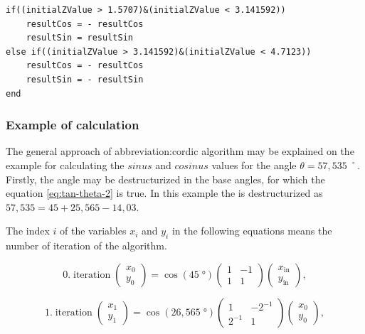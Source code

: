 \documentclass[a4paper, twoside, 11pt]{article}
\begin{document}
\begin{lstlisting}[language={pseudocode}, caption={Pseudocode for if statements used at the final $sinus$ and $cosinus$ value calculation.}, label= {lst:cordic-ending-if-statements}]
if((initialZValue > 1.5707)&(initialZValue < 3.141592))
    resultCos = - resultCos
    resultSin = resultSin
else if((initialZValue > 3.141592)&(initialZValue < 4.7123))
    resultCos = - resultCos
    resultSin = - resultSin
end
\end{lstlisting}

        \subsubsection{Example of calculation}\label{subsubsec:example-of-calculation}
            The general approach of \gls{abbreviation:cordic} algorithm may be explained on the example for calculating the $sinus$ and $cosinus$ values for the angle $\theta = 57,535\;˚$. Firstly, the angle may be destructurized in the base angles, for which the equation \ref{eq:tan-theta-2} is true. In this example the is destructurized as $57,535 = 45 + 25,565 -14,03$.\par
            The index $i$ of the variables $x_i$ and $y_i$ in the following equations means the number of iteration of the algorithm.

            \begin{equation}
                0.\;\text{iteration}\;
                \begin{pmatrix}
                    x_0\\y_0
                \end{pmatrix}
                =
                \cos (45\;°)
                \begin{pmatrix}
                    1 & -1\\
                    1 & 1
                \end{pmatrix}
                \begin{pmatrix}
                    x_\text{in}\\
                    y_\text{in}
                \end{pmatrix},
            \end{equation}

            
            \begin{equation}
                1.\;\text{iteration}\;
                \begin{pmatrix}
                    x_1\\y_1
                \end{pmatrix}
                =
                \cos (26,565\;°)
                \begin{pmatrix}
                    1 & -2^{-1}\\
                    2^{-1} & 1
                \end{pmatrix}
                \begin{pmatrix}
                    x_0\\
                    y_0
                \end{pmatrix},
            \end{equation}
\end{document}
